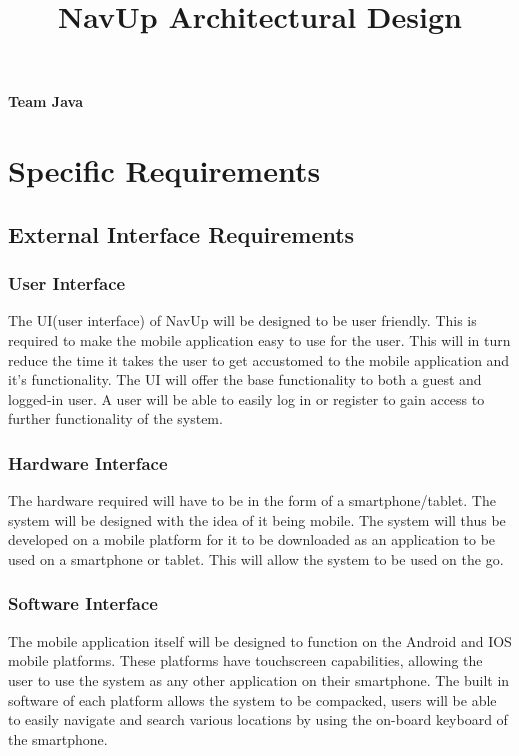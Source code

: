\documentclass{article}
\begin{document}
\title{NavUp Architectural Design}
\maketitle
		\begin{center}
			\textbf{\newline Team Java} \\
		\end{center}
			
				
		\begin{flushright} \large
		\end{flushright}
\clearpage
\tableofcontents
	
\clearpage
\section{Specific Requirements}
	\subsection{External Interface Requirements}
		\subsubsection{User Interface}
The UI(user interface) of NavUp will be designed to be user friendly. This is required to make the mobile application easy to use for the user. This will in turn reduce the time it takes the user to get accustomed to the mobile application and it's functionality. The UI will offer the base functionality to both a guest and logged-in user. A user will be able to easily log in or register to gain access to further functionality of the system.

		\subsubsection{Hardware Interface}
The hardware required will have to be in the form of a smartphone/tablet. The system will be designed with the idea of it being mobile. The system will thus be developed on a mobile platform for it to be downloaded as an application to be used on a smartphone or tablet. This will allow the system to be used on the go.

		\subsubsection{Software Interface}
The mobile application itself will be designed to function on the Android and IOS mobile platforms. These platforms have touchscreen capabilities, allowing the user to use the system as any other application on their smartphone. The built in software of each platform allows the system to be compacked, users will be able to easily navigate and search various locations by using the on-board keyboard of the smartphone.
\end{document}
